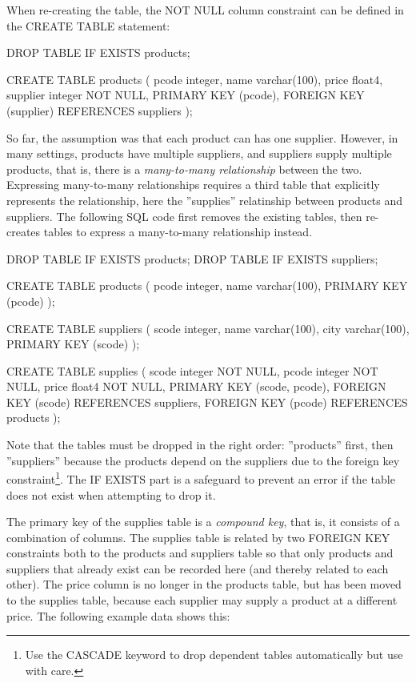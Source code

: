 When re-creating the table, the NOT NULL column constraint can be defined in the CREATE TABLE statement:

\begin{samepage}
\begin{sqlcode}
DROP TABLE IF EXISTS products;

CREATE TABLE products (
  pcode    integer,
  name     varchar(100),
  price    float4,
  supplier integer NOT NULL,
  PRIMARY KEY (pcode),
  FOREIGN KEY (supplier) REFERENCES suppliers 
);
\end{sqlcode}
\end{samepage}

So far, the assumption was that each product can has one supplier. However, in many settings, products have multiple suppliers, and suppliers supply multiple products, that is, there is a \emph{many-to-many relationship} between the two. Expressing many-to-many relationships requires a third table that explicitly represents the relationship, here the ''supplies'' relatinship between products and suppliers. The following SQL code first removes the existing tables, then re-creates tables to express a many-to-many relationship instead.

\begin{samepage}
\begin{sqlcode}
DROP TABLE IF EXISTS products;
DROP TABLE IF EXISTS suppliers;

CREATE TABLE products (
  pcode integer,
  name  varchar(100),
  PRIMARY KEY (pcode) );

CREATE TABLE suppliers (
  scode integer,
  name  varchar(100),
  city  varchar(100),
  PRIMARY KEY (scode) );
  
CREATE TABLE supplies (
  scode  integer NOT NULL,
  pcode  integer NOT NULL,
  price  float4 NOT NULL,
  PRIMARY KEY (scode, pcode),
  FOREIGN KEY (scode) REFERENCES suppliers,
  FOREIGN KEY (pcode) REFERENCES products );
\end{sqlcode}
\end{samepage}

Note that the tables must be dropped in the right order: ''products'' first, then ''suppliers'' because the products depend on the suppliers due to the foreign key constraint\footnote{Use the CASCADE keyword to drop dependent tables automatically but use with care.}. The IF EXISTS part is a safeguard to prevent an error if the table does not exist when attempting to drop it.

The primary key of the supplies table is a \emph{compound key}, that is, it consists of a combination of columns. The supplies table is related by two FOREIGN KEY constraints both to the products and suppliers table so that only products and suppliers that already exist can be recorded here (and thereby related to each other). The price column is no longer in the products table, but has been moved to the supplies table, because each supplier may supply a product at a different price. The following example data shows this:

